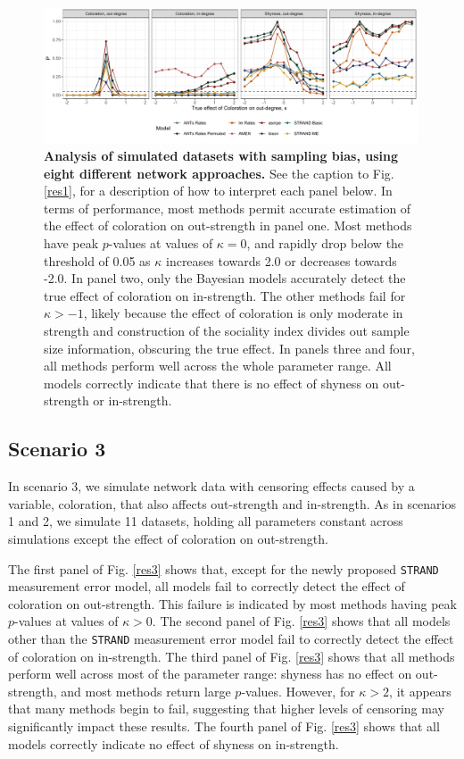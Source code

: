 \documentclass[Afour,sageh,times]{sagej}
\begin{document}
\begin{figure}[t]
  \caption{\textbf{Analysis of simulated datasets with sampling bias, using eight different network approaches.} See the caption to Fig. \ref{res1}, for a description of how to interpret each panel below. In terms of performance, most methods permit accurate estimation of the effect of coloration on out-strength in panel one. Most methods have peak $p$-values at values of $\kappa=0$, and rapidly drop below the threshold of 0.05 as $\kappa$ increases towards 2.0 or decreases towards -2.0.   In panel two, only the Bayesian models accurately detect the true effect of coloration on in-strength. The other methods fail for $\kappa>-1$, likely because the effect of coloration is only moderate in strength and construction of the sociality index divides out sample size information, obscuring the true effect. In panels three and four, all methods perform well across the whole parameter range. All models correctly indicate that there is no effect of shyness on out-strength or in-strength. }  \label{res2}
  \centering
      \includegraphics[width=0.99\textwidth]{Figures/Sampling_model}
\end{figure}

\subsection{Scenario 3}
In scenario 3, we simulate network data with censoring effects caused by a variable, coloration, that also affects out-strength and in-strength.  As in scenarios 1 and 2, we simulate 11 datasets, holding all parameters constant across simulations except the effect of coloration on out-strength. 

The first panel of Fig. \ref{res3} shows that, except for the newly proposed \texttt{STRAND} measurement error model, all models fail to correctly detect the effect of coloration on out-strength. This failure is indicated by most methods having peak $p$-values at values of $\kappa>0$. The second panel of Fig. \ref{res3} shows that all models other than the \texttt{STRAND} measurement error model fail to correctly detect the effect of coloration on in-strength. The third panel of Fig. \ref{res3} shows that all methods perform well across most of the parameter range: shyness has no effect on out-strength, and most methods return large $p$-values. However, for $\kappa > 2$, it appears that many methods begin to fail, suggesting that higher levels of censoring may significantly impact these results. The fourth panel of Fig. \ref{res3} shows that all models correctly indicate no effect of shyness on in-strength.
\end{document}
